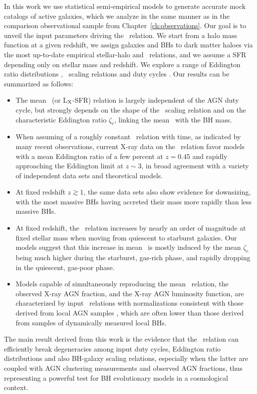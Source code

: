 In this work we use statistical semi-empirical models to generate accurate mock catalogs of active galaxies, which we analyze in the same manner as in the comparison observational sample from Chapter~\ref{ch:observations}. Our goal is to unveil the input parameters driving the \LXMS\ relation. We start from a halo mass function at a given redshift, we assign galaxies and BHs to dark matter haloes via the most up-to-date empirical stellar-halo and \MBHMS\ relations, and we assume a SFR depending only on stellar mass and redshift. We explore a range of Eddington ratio distributions \PLz, \MBHMS\ scaling relations and duty cycles \UMBHz. Our results can be summarized as follows:
 \begin{itemize}
    \item The mean \LXMS\ (or L$_{\rm X}$-SFR) relation is largely independent of the AGN duty cycle, but strongly depends on the shape of the \MBHMS\ scaling relation and on the characteristic Eddington ratio $\zeta_c$, linking the mean \LX\ with the BH mass. 
    \item When assuming of a roughly constant \MBHMS\ relation with time, as indicated by many recent observations, current X-ray data on the \LXMS\ relation favor models with a mean Eddington ratio of a few percent at $z=0.45$ and rapidly approaching the Eddington limit at $z\sim 3$, in broad agreement with a variety of independent data sets and theoretical models. 
    \item At fixed redshift $z \gtrsim 1$, the same data sets also show evidence for downsizing, with the most massive BHs having accreted their mass more rapidly than less massive BHs.  
    \item At fixed redshift, the \LXMS\ relation increases by nearly an order of magnitude at fixed stellar mass when moving from quiescent to starburst galaxies. Our models suggest that this increase in mean \LX\ is mostly induced by the mean $\zeta_c$ being much higher during the starburst, gas-rich phase, and rapidly dropping in the quiescent, gas-poor phase. 
    \item Models capable of simultaneously reproducing the mean \LXMS\ relation, the observed X-ray AGN fraction, and the X-ray AGN luminosity function, are characterized by input \MBHMS\ relations with normalizations consistent with those derived from local AGN samples \citep[e.g.,][]{2015ApJ...813...82R,Shankar19}, which are often lower than those derived from samples of dynamically measured local BHs.
\end{itemize}
The main result derived from this work is the evidence that the \LXMS\ relation can efficiently break degeneracies among input duty cycles, Eddington ratio distributions and also BH-galaxy scaling relations, especially when the latter are coupled with AGN clustering measurements \citep{ShankarNat} and observed AGN fractions, thus representing a powerful test for BH evolutionary models in a cosmological context.